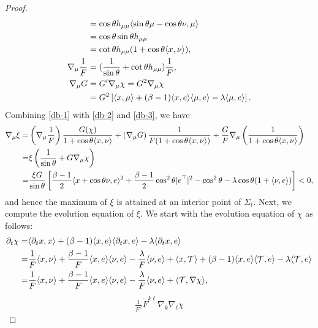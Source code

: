 \documentclass[11pt,reqno]{amsart}
\theoremstyle{definition}
\theoremstyle{remark}
\numberwithin{equation}{section}
\renewcommand{\(}{\left(}
\renewcommand{\)}{\right)}
\renewcommand{\-}{\overline}
\begin{document}
\begin{proof}
\begin{align}
	&=\cos\theta h_{\mu\mu}\langle \sin\theta\mu-\cos\theta\nu,\mu \rangle\notag\\
	&=\cos\theta\sin\theta h_{\mu\mu}\notag\\
	&=\cot\theta h_{\mu\mu}(1+\cos\theta\langle x,\nu \rangle),\label{db-1}\\
	\nabla_{\mu}{\frac{1}{F}}&=(\frac{1}{\sin\theta}+\cot\theta h_{\mu\mu})\frac{1}{F},\label{db-2}\\
	\nabla_{\mu}{G}&=G'\nabla_{\mu}{\chi}=G^2\nabla_{\mu}{\chi}\notag\\
	&=G^2\left[\langle x,\mu\rangle+(\beta-1)\langle x,e\rangle\langle \mu,e\rangle-\lambda\langle\mu,e\rangle\right].\label{db-3}
\end{align}
Combining \eqref{db-1} with \eqref{db-2} and \eqref{db-3}, we have
\begin{align}
	\nabla_{\mu}{\xi}
	=&\left(\nabla_{\mu}{\frac{1}{F}}\right)\frac{G(\chi)}{1+\cos\theta\langle x,\nu \rangle}+\left(\nabla_{\mu}G\right)\frac{1}{F(1+\cos\theta\langle x,\nu \rangle)}+\frac{G}{F}\nabla_{\mu}\left(\frac{1}{1+\cos\theta\langle x,\nu \rangle}\right)\notag\\
	=&\xi\left(\frac{1}{\sin\theta}+G\nabla_{\mu}{\chi}\right)\notag\\
	=&\frac{\xi G}{\sin\theta}\left[\frac{\beta-1}{2}\langle x+\cos\theta\nu,e\rangle^2+\frac{\beta-1}{2}\cos^2{\theta}|e^{\top}|^2-\cos^2\theta-\lambda\cos\theta(1+\langle\nu,e\rangle)\right]<0,\label{boundary-xi}
\end{align}
and hence the maximum of $\xi$ is attained at an interior point of $\Sigma_t$. Next, we compute the evolution equation of $\xi$. We start with the evolution equation of $\chi$ as follows:
\begin{align}
	\partial_t\chi=&\langle\partial_t{x},x\rangle+(\beta-1)\langle x,e\rangle\langle\partial_t{x},e\rangle-\lambda\langle \partial_t{x},e\rangle\notag\\
	=&\frac{1}{F}\langle x,\nu\rangle+\frac{\beta-1}{F}\langle x,e\rangle\langle\nu,e\rangle-\frac{\lambda}{F}\langle\nu,e\rangle+\langle x,\mathcal{T}\rangle+(\beta-1)\langle x,e\rangle\langle \mathcal{T},e\rangle-\lambda\langle \mathcal{T},e\rangle\notag\\
	=&\frac{1}{F}\langle x,\nu\rangle+\frac{\beta-1}{F}\langle x,e\rangle\langle\nu,e\rangle-\frac{\lambda}{F}\langle\nu,e\rangle+\langle \mathcal{T},\nabla\chi \rangle, \label{partial-chi}
\end{align}
\begin{align}
		\frac{1}{F^2}\dot{F}^{k\ell}\nabla_k\nabla_{\ell}{\chi}

\end{align}
\end{proof}
\end{document}
